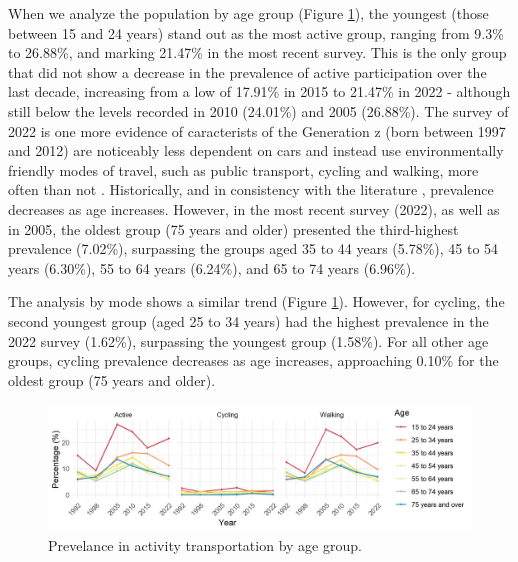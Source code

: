 \documentclass[preprint, 3p,
authoryear]{elsarticle} %
\begin{document}
When we analyze the population by age group (Figure
\ref{fig:age-perc-figure}), the youngest (those between 15 and 24 years)
stand out as the most active group, ranging from 9.3\% to 26.88\%, and
marking 21.47\% in the most recent survey. This is the only group that
did not show a decrease in the prevalence of active participation over
the last decade, increasing from a low of 17.91\% in 2015 to 21.47\% in
2022 - although still below the levels recorded in 2010 (24.01\%) and
2005 (26.88\%). The survey of 2022 is one more evidence of caracterists
of the Generation z (born between 1997 and 2012) \citep{dimock2019} are
noticeably less dependent on cars and instead use environmentally
friendly modes of travel, such as public transport, cycling and walking,
more often than not \citep{haseeb2024, grimsrud2014, kuhnimhof2011}.
Historically, and in consistency with the literature
\citep{bryan2009, borhani2024}, prevalence decreases as age increases.
However, in the most recent survey (2022), as well as in 2005, the
oldest group (75 years and older) presented the third-highest prevalence
(7.02\%), surpassing the groups aged 35 to 44 years (5.78\%), 45 to 54
years (6.30\%), 55 to 64 years (6.24\%), and 65 to 74 years (6.96\%).

The analysis by mode shows a similar trend (Figure
\ref{fig:age-perc-figure}). However, for cycling, the second youngest
group (aged 25 to 34 years) had the highest prevalence in the 2022
survey (1.62\%), surpassing the youngest group (1.58\%). For all other
age groups, cycling prevalence decreases as age increases, approaching
0.10\% for the oldest group (75 years and older).

\begin{figure}
\includegraphics[width=1\linewidth]{figures/active_pop_age_graph} \caption{Prevelance in activity transportation by age group.}\label{fig:age-perc-figure}
\end{figure}
\end{document}
